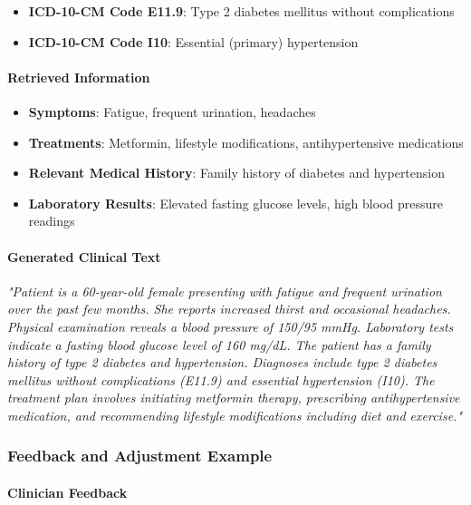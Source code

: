 \documentclass[12pt, a4paper]{article}
\begin{document}
\begin{itemize}
    \item \textbf{ICD-10-CM Code E11.9}: Type 2 diabetes mellitus without complications
    \item \textbf{ICD-10-CM Code I10}: Essential (primary) hypertension
\end{itemize}

\paragraph{Retrieved Information}

\begin{itemize}
    \item \textbf{Symptoms}: Fatigue, frequent urination, headaches
    \item \textbf{Treatments}: Metformin, lifestyle modifications, antihypertensive medications
    \item \textbf{Relevant Medical History}: Family history of diabetes and hypertension
    \item \textbf{Laboratory Results}: Elevated fasting glucose levels, high blood pressure readings
\end{itemize}

\paragraph{Generated Clinical Text}

\textit{"Patient is a 60-year-old female presenting with fatigue and frequent urination over the past few months. She reports increased thirst and occasional headaches. Physical examination reveals a blood pressure of 150/95 mmHg. Laboratory tests indicate a fasting blood glucose level of 160 mg/dL. The patient has a family history of type 2 diabetes and hypertension. Diagnoses include type 2 diabetes mellitus without complications (E11.9) and essential hypertension (I10). The treatment plan involves initiating metformin therapy, prescribing antihypertensive medication, and recommending lifestyle modifications including diet and exercise."}

\subsubsection{Feedback and Adjustment Example}

\paragraph{Clinician Feedback}
\end{document}
